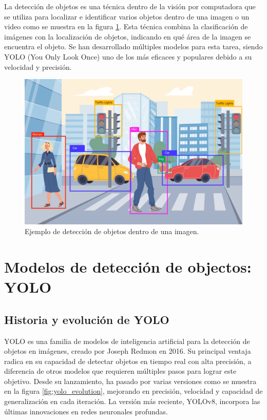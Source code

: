 La detección de objetos es una técnica dentro de la visión por computadora que se utiliza para localizar e identificar varios objetos dentro de una imagen o un video como se muestra en la figura \ref{fig:object_detection}. Esta técnica combina la clasificación de imágenes con la localización de objetos, indicando en qué área de la imagen se encuentra el objeto. Se han desarrollado múltiples modelos para esta tarea, siendo YOLO (You Only Look Once) uno de los más eficaces y populares debido a su velocidad y precisión.

\begin{figure}[!ht]
  \centering
  \includegraphics[width=.49\linewidth]{images/object_detection.png}
  \caption{Ejemplo de detección de objetos dentro de una imagen.}
  \label{fig:object_detection}
\end{figure}

\section{Modelos de detección de objectos: YOLO}

\subsection{Historia y evolución de YOLO}

YOLO es una familia de modelos de inteligencia artificial para la detección de objetos en imágenes, creado por Joseph Redmon en 2016. Su principal ventaja radica en su capacidad de detectar objetos en tiempo real con alta precisión, a diferencia de otros modelos que requieren múltiples pasos para lograr este objetivo. Desde su lanzamiento, ha pasado por varias versiones como se muestra en la figura \ref{fig:yolo_evolution}, mejorando en precisión, velocidad y capacidad de generalización en cada iteración. La versión más reciente, YOLOv8, incorpora las últimas innovaciones en redes neuronales profundas.

